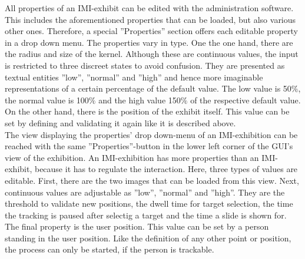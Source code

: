 All properties of an \ac{IMI}-exhibit can be edited with the administration software. This includes the aforementioned properties that can be loaded, but also various other ones. Therefore, a special ''Properties'' section offers each editable property in a drop down menu. The properties vary in type. One the one hand, there are the radius and size of the kernel. Although these are continuous values, the input is restricted to three discreet states to avoid confusion. They are presented as textual entities ''low'', ''normal'' and ''high'' and hence more imaginable representations of a certain percentage of the default value. The low value is 50$\%$, the normal value is 100$\%$ and the high value 150$\%$ of the respective default value. On the other hand, there is the position of the exhibit itself. This value can be set by defining and validating it again like it is described above.
\\
The view displaying the properties' drop down-menu of an \ac{IMI}-exhibition can be reached with the same ''Properties''-button in the lower left corner of the \ac{GUI}'s view of the exhibition. An \ac{IMI}-exhibition has more properties than an \ac{IMI}-exhibit, because it has to regulate the interaction. Here, three types of values are editable. First, there are the two images that can be loaded from this view. Next, continuous values are adjustable as ''low'', ''normal'' and ''high''. They are the threshold to validate new positions, the dwell time for target selection, the time the tracking is paused after selectig a target and the time a slide is shown for. The final property is the user position. This value can be set by a person standing in the user position. Like the definition of any other point or position, the process can only be started, if the person is trackable. 

